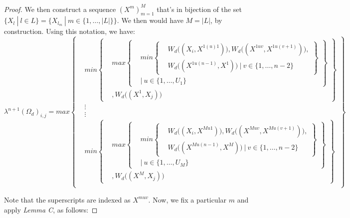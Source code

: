 \documentclass{article} %
\begin{document}
\begin{proof}
We then construct a sequence $(X^m)_{m=1}^M$ that's in bijection of the set $\{X_l\ |\ l\in L\}=\big\{X_{l_m}\ |\ m\in\{1,\ldots,|L|\}\big\}$. We then would have $M=|L|$, by construction. Using this notation, we have:
\[
\lambda^{n+1}(\Omega_d)_{i,j} =max
\left\{
  \begin{aligned}
    &min
      \left\{
      \begin{aligned}
        &max
          \left\{
          \begin{aligned}
            &min\left\{
            \begin{aligned}
            &W_d\big((X_i,X^{1(u)1})\big), W_d\big((X^{1uv},X^{1u(v+1)})\big), \\
            &W_d\big((X^{1u(n-1)},X^1)\big)\ |\ v\in\{1,\ldots,n-2\}
            \end{aligned}
            \right\} \\
            &|\ u\in\{1,\ldots,U_1\}
          \end{aligned}
          \right\} \\
          &, W_d\big((X^1,X_j)\big)
      \end{aligned}
      \right\} \\
      &\vdots \\
      &\vdots \\
    &min
      \left\{
      \begin{aligned}
        &max
          \left\{
          \begin{aligned}
            &min\left\{
            \begin{aligned}
            &W_d\big((X_i,X^{Mu1})\big), W_d\big((X^{Muv},X^{Mu(v+1)})\big), \\
            &W_d\big((X^{Mu(n-1)},X^M)\big)\ |\ v\in\{1,\ldots,n-2\}
            \end{aligned}
            \right\} \\
            &|\ u\in\{1,\ldots,U_M\}
          \end{aligned}
          \right\} \\
          &, W_d\big((X^M,X_j)\big)
      \end{aligned}
      \right\} \\
  \end{aligned}
\right\}
\]

Note that the superscripts are indexed as $X^{muv}$. Now, we fix a particular $m$ and apply \textit{Lemma C}, as follows:


\end{proof}
\end{document}
